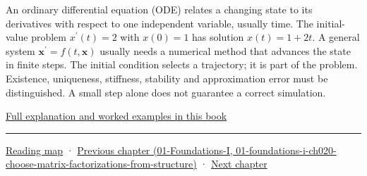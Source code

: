 An ordinary differential equation (ODE) relates a changing state to its derivatives with respect to one independent variable, usually time. The initial-value problem \(x^{\prime}(t)=2\) with \(x(0)=1\) has solution \(x(t)=1+2t\). A general system \(\mathbf x^{\prime}=f(t,\mathbf x)\) usually needs a numerical method that advances the state in finite steps. The initial condition selects a trajectory; it is part of the problem. Existence, uniqueness, stiffness, stability and approximation error must be distinguished. A small step alone does not guarantee a correct simulation.

\hyperref[02-foundations-ii-ch025-odes-and-numerical-simulation]{Full explanation and worked examples in this book}

\begin{center}\rule{0.5\linewidth}{0.5pt}\end{center}

\hyperref[volume-reading-map]{Reading map} · \href{../01-Foundations-I/main.pdf\#nameddest=01-foundations-i-ch020-choose-matrix-factorizations-from-structure}{Previous chapter (01-Foundations-I, 01-foundations-i-ch020-choose-matrix-factorizations-from-structure)} · \hyperref[02-foundations-ii-ch022-accumulation-quadrature-and-the-bridge-to-probability]{Next chapter}
